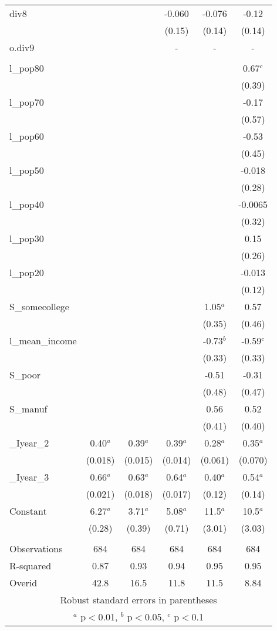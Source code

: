 \documentclass[]{article}
\begin{document}
\begin{tabular}{lccccc}
div8 &  &  & -0.060 & -0.076 & -0.12 \\
 &  &  & (0.15) & (0.14) & (0.14) \\
o.div9 &  &  & - & - & - \\
 &  &  &  &  &  \\
l\_pop80 &  &  &  &  & 0.67$^c$ \\
 &  &  &  &  & (0.39) \\
l\_pop70 &  &  &  &  & -0.17 \\
 &  &  &  &  & (0.57) \\
l\_pop60 &  &  &  &  & -0.53 \\
 &  &  &  &  & (0.45) \\
l\_pop50 &  &  &  &  & -0.018 \\
 &  &  &  &  & (0.28) \\
l\_pop40 &  &  &  &  & -0.0065 \\
 &  &  &  &  & (0.32) \\
l\_pop30 &  &  &  &  & 0.15 \\
 &  &  &  &  & (0.26) \\
l\_pop20 &  &  &  &  & -0.013 \\
 &  &  &  &  & (0.12) \\
S\_somecollege &  &  &  & 1.05$^a$ & 0.57 \\
 &  &  &  & (0.35) & (0.46) \\
l\_mean\_income &  &  &  & -0.73$^b$ & -0.59$^c$ \\
 &  &  &  & (0.33) & (0.33) \\
S\_poor &  &  &  & -0.51 & -0.31 \\
 &  &  &  & (0.48) & (0.47) \\
S\_manuf &  &  &  & 0.56 & 0.52 \\
 &  &  &  & (0.41) & (0.40) \\
\_Iyear\_2 & 0.40$^a$ & 0.39$^a$ & 0.39$^a$ & 0.28$^a$ & 0.35$^a$ \\
 & (0.018) & (0.015) & (0.014) & (0.061) & (0.070) \\
\_Iyear\_3 & 0.66$^a$ & 0.63$^a$ & 0.64$^a$ & 0.40$^a$ & 0.54$^a$ \\
 & (0.021) & (0.018) & (0.017) & (0.12) & (0.14) \\
Constant & 6.27$^a$ & 3.71$^a$ & 5.08$^a$ & 11.5$^a$ & 10.5$^a$ \\
 & (0.28) & (0.39) & (0.71) & (3.01) & (3.03) \\
 &  &  &  &  &  \\
Observations & 684 & 684 & 684 & 684 & 684 \\
R-squared & 0.87 & 0.93 & 0.94 & 0.95 & 0.95 \\
 Overid & 42.8 & 16.5 & 11.8 & 11.5 & 8.84 \\ \hline
\multicolumn{6}{c}{ Robust standard errors in parentheses} \\
\multicolumn{6}{c}{ $^a$ p$<$0.01, $^b$ p$<$0.05, $^c$ p$<$0.1} \\
\end{tabular}
\end{document}
